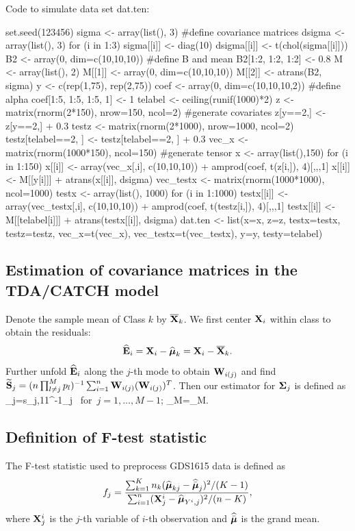  Code to simulate data set dat.ten:
 
 
\begin{example}
set.seed(123456)
sigma <- array(list(), 3) #define covariance matrices
dsigma <- array(list(), 3)
for (i in 1:3){
   sigma[[i]] <- diag(10)
   dsigma[[i]] <- t(chol(sigma[[i]]))
}
B2 <- array(0, dim=c(10,10,10)) #define B and mean
B2[1:2, 1:2, 1:2] <- 0.8
M <- array(list(), 2)
M[[1]] <- array(0, dim=c(10,10,10))
M[[2]] <- atrans(B2, sigma)
y <- c(rep(1,75), rep(2,75))
coef <- array(0, dim=c(10,10,10,2)) #define alpha
coef[1:5, 1:5, 1:5, 1] <- 1
telabel <- ceiling(runif(1000)*2)  
z <- matrix(rnorm(2*150), nrow=150, ncol=2) #generate covariates
z[y==2,] <- z[y==2,] + 0.3
testz <- matrix(rnorm(2*1000), nrow=1000, ncol=2)
testz[telabel==2, ] <- testz[telabel==2, ] + 0.3
vec_x <- matrix(rnorm(1000*150), ncol=150) #generate tensor
x <- array(list(),150)
for (i in 1:150){
   x[[i]] <- array(vec_x[,i], c(10,10,10)) + amprod(coef, t(z[i,]), 4)[,,,1]
   x[[i]] <- M[[y[i]]] + atrans(x[[i]], dsigma)
}
vec_testx <- matrix(rnorm(1000*1000), ncol=1000)
testx <- array(list(), 1000)
for (i in 1:1000){
   testx[[i]] <- array(vec_testx[,i], c(10,10,10)) + amprod(coef, t(testz[i,]),
 4)[,,,1]
   testx[[i]] <- M[[telabel[i]]] + atrans(testx[[i]], dsigma)
}
dat.ten <- list(x=x, z=z, testx=testx, testz=testz, vec_x=t(vec_x),       
   vec_testx=t(vec_testx), y=y, testy=telabel)
\end{example} 
 
 \subsection{Estimation of covariance matrices in the TDA/CATCH model}\label{Appendix.C}
 
 Denote the sample mean of Class $k$ by $\overline{\mathbf{X}}_k$. We first center $\mathbf{X}_i$ within class to obtain the residuals:
 $$
 \widehat{\mathbf{E}}_{i}=\mathbf{X}_{i}-\widehat{\boldsymbol{\mu}}_k=\mathbf{X}_{i}-\overline{\mathbf{X}}_k.
 $$
 Further unfold $\widehat{\mathbf{E}}_{i}$ along the $j$-th mode to obtain $\mathbf{W}_{i(j)}$ and find $\widetilde{\mathbf{S}}_j=(n\prod_{l\neq j}^{M}p_l)^{-1}\sum_{i=1}^{n}\mathbf{W}_{i(j)}(\mathbf{W}_{i(j)})^T$. Then our estimator for $\boldsymbol{\Sigma}_j$ is defined as
 \bea\label{sigma.hat}
 \hatbolSigma_{j}=\widetilde s_{j,11}^{-1}\widetilde{\mbS}_j \mbox{ for $j=1,\ldots,M-1$}; \hatbolSigma_{M}=\widetilde{\mbS}_M.
 \eea
 
 
 
 
 
 \subsection{Definition of F-test statistic}
 The F-test statistic used to preprocess GDS1615 data is defined as
 \begin{equation}
 f_j=\frac{\sum_{k=1}^Kn_k(\widehat{\boldsymbol{\mu}}_{kj}-\widehat{\bar{\boldsymbol{\mu}}}_j)^2/(K-1)}{\sum_{i=1}^n(\mathbf{X}_j^i-\widehat{\boldsymbol{\mu}}_{Y^i,j})^2/(n-K)},
 \end{equation}
 where $\mathbf{X}_j^i$ is the $j$-th variable of $i$-th observation and $\widehat{\bar{\boldsymbol{\mu}}}$ is the grand mean. 


